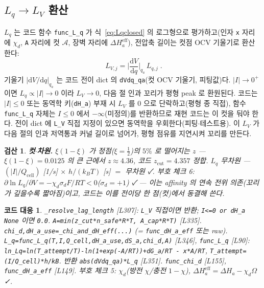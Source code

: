 \documentclass[11pt,a4paper]{article}
\newtheorem*{codebox}{코드 대응}
\newtheorem*{verifybox}{검산}
\newcommand{\dd}{\mathrm{d}}
\newcommand{\eff}{\mathrm{eff}}
\newcommand{\cell}{\mathrm{cell}}
\newcommand{\sgn}{\sigma_d}
\begin{document}
\subsection{$L_q\to L_V$ 환산}
$L_q$ 는 코드 함수 \texttt{func\_L\_q} 가 식~\eqref{eq:Lqclosed} 의 로그형으로 평가하고(인자 \texttt{x} 자리에 $\chi_d$, \texttt{A} 자리에 컷 $\mathcal A$, 장벽 자리에 $\Delta H_a^\eff$), 전압축 길이는 컷점 OCV 기울기로 환산한다:
\begin{equation}
\boxed{\;L_{V,j}=\Big|\frac{\dd V}{\dd q}\Big|_{q_a}\,L_{q,j}\;.}
\label{eq:LV}
\end{equation}
기울기 $|\dd V/\dd q|_{q_a}$ 는 코드 전이 dict 의 \texttt{dVdq\_qa}(컷 OCV 기울기, 피팅값)다. $|I|\to0^+$ 이면 $L_q\propto|I|\to0$ 이라 $L_V\to0$, 다음 절 인과 꼬리가 평형 peak 로 환원된다. 코드는 $|I|\le0$ 또는 동역학 키(\texttt{dH\_a}) 부재 시 $L_V$ 를 $0$ 으로 단락하고(평형 종 직접), 함수 \texttt{func\_L\_q} 자체는 $I\le0$ 에서 $-\infty$(미정의)를 반환하므로 재현 코드는 이 컷을 둬야 한다. 전이 dict 에 \texttt{L\_V} 직접 지정이 있으면 동역학을 우회한다(피팅$\cdot$테스트용). 이 $L_V$ 가 다음 절의 인과 저역통과 커널 길이로 넘어가, 평형 점유를 지연시켜 꼬리를 만든다.

\begin{verifybox}
\textbf{컷$\cdot$차원.} $\xi(1-\xi)$ 가 정점($\xi=\tfrac12$)의 $5\%$ 로 떨어지는 $z$ — $\xi(1-\xi)=0.0125$ 의 큰 근에서 $z\approx4.36$, 코드 $z_{\mathrm{cut}}=4.357$ 정합. $L_q$ 무차원 — $(|I|/Q_\cell)$ [1/s] $\times$ $h/(k_BT)$ [s] $=$ 무차원 ✓. 부호 체크 6: $\partial\ln L_q/\partial V=-\chi_d\sgn F/RT<0$($\sgn=+1$) ✓ — 이는 affinity 의 \emph{연속} 전위 의존(꼬리가 깊을수록 짧아짐)이고, 코드는 이를 전이당 한 점(컷)에서 동결해 쓴다.
\end{verifybox}

\begin{codebox}
\texttt{\_resolve\_lag\_length} [L307]: \texttt{L\_V} 직접이면 반환; \texttt{I<=0 or dH\_a None} 이면 \texttt{0.0}. \texttt{A=min(z\_cut*n\_safe*R*T, A\_cap*R*T)} [L335]. \texttt{chi\_d,dH\_a\_use=\_chi\_and\_dH\_eff(...)} (= \texttt{func\_dH\_a\_eff} 또는 raw). \texttt{L\_q=func\_L\_q(T,I,Q\_cell,dH\_a\_use,dS\_a,chi\_d,A)} [L346], \texttt{func\_L\_q} [L90]: \texttt{ln\_Lq=ln(T\_attempt/T)-ln(1+exp(-A/RT))+dG\_a/RT - x*A/RT}, \texttt{T\_attempt=(I/Q\_cell)*h/kB}. 반환 \texttt{abs(dVdq\_qa)*L\_q} [L351]. \texttt{func\_chi\_d} [L155], \texttt{func\_dH\_a\_eff} [L149]. 부호 체크 5: $\chi_d$(방전 $\chi$/충전 $1-\chi$), $\Delta H_a^\eff=\Delta H_a-\chi_d\Omega$ ✓.
\end{codebox}
\end{document}
